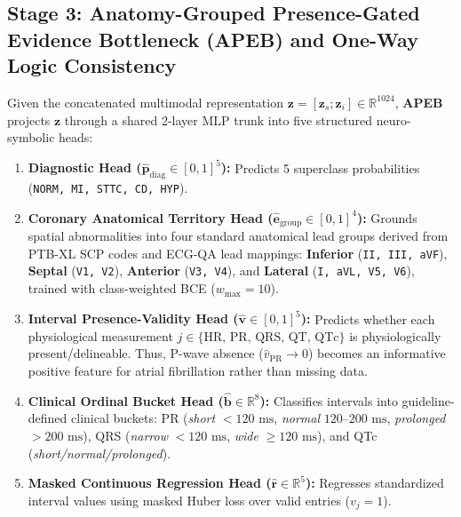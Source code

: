 \documentclass[preprint,12pt]{elsarticle}
\begin{document}
\subsection{Stage 3: Anatomy-Grouped Presence-Gated Evidence Bottleneck (APEB) and One-Way Logic Consistency}
Given the concatenated multimodal representation $\bm{z} = [\bm{z}_s; \bm{z}_i] \in \mathbb{R}^{1024}$, \textbf{APEB} projects $\bm{z}$ through a shared 2-layer MLP trunk into five structured neuro-symbolic heads:
\begin{enumerate}
    \item \textbf{Diagnostic Head ($\hat{\bm{p}}_{\text{diag}} \in [0,1]^5$):} Predicts 5 superclass probabilities (\texttt{NORM, MI, STTC, CD, HYP}).
    \item \textbf{Coronary Anatomical Territory Head ($\hat{\bm{e}}_{\text{group}} \in [0,1]^4$):} Grounds spatial abnormalities into four standard anatomical lead groups derived from PTB-XL SCP codes and ECG-QA lead mappings: \textbf{Inferior} (\texttt{II, III, aVF}), \textbf{Septal} (\texttt{V1, V2}), \textbf{Anterior} (\texttt{V3, V4}), and \textbf{Lateral} (\texttt{I, aVL, V5, V6}), trained with class-weighted BCE ($w_{\max}=10$).
    \item \textbf{Interval Presence-Validity Head ($\hat{\bm{v}} \in [0,1]^5$):} Predicts whether each physiological measurement $j \in \{\text{HR, PR, QRS, QT, QTc}\}$ is physiologically present/delineable. Thus, P-wave absence ($\hat{v}_{\text{PR}} \to 0$) becomes an informative positive feature for atrial fibrillation rather than missing data.
    \item \textbf{Clinical Ordinal Bucket Head ($\hat{\bm{b}} \in \mathbb{R}^8$):} Classifies intervals into guideline-defined clinical buckets: PR (\emph{short} $<120\text{ ms}$, \emph{normal} $120\text{--}200\text{ ms}$, \emph{prolonged} $>200\text{ ms}$), QRS (\emph{narrow} $<120\text{ ms}$, \emph{wide} $\ge 120\text{ ms}$), and QTc (\emph{short/normal/prolonged}).
    \item \textbf{Masked Continuous Regression Head ($\hat{\bm{r}} \in \mathbb{R}^5$):} Regresses standardized interval values using masked Huber loss over valid entries ($v_j = 1$).
\end{enumerate}
\end{document}
